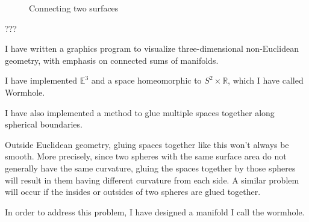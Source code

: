 \begin{figure}[h]
{}
\caption{Connecting two surfaces}
\end{figure}

???

I have written a graphics program to visualize three-dimensional non-Euclidean geometry, with emphasis on connected sums of manifolds.

I have implemented $\mathbb{E}^3$ and a space homeomorphic to $S^2 \times \mathbb{R}$, which I have called Wormhole.

I have also implemented a method to glue multiple spaces together along spherical boundaries.

Outside Euclidean geometry, gluing spaces together like this won't always be smooth. More precisely, since two spheres with the same surface area do not generally have the same curvature, gluing the spaces together by those spheres will result in them having different curvature from each side. A similar problem will occur if the insides or outsides of two spheres are glued together.

In order to address this problem, I have designed a manifold I call the wormhole.

